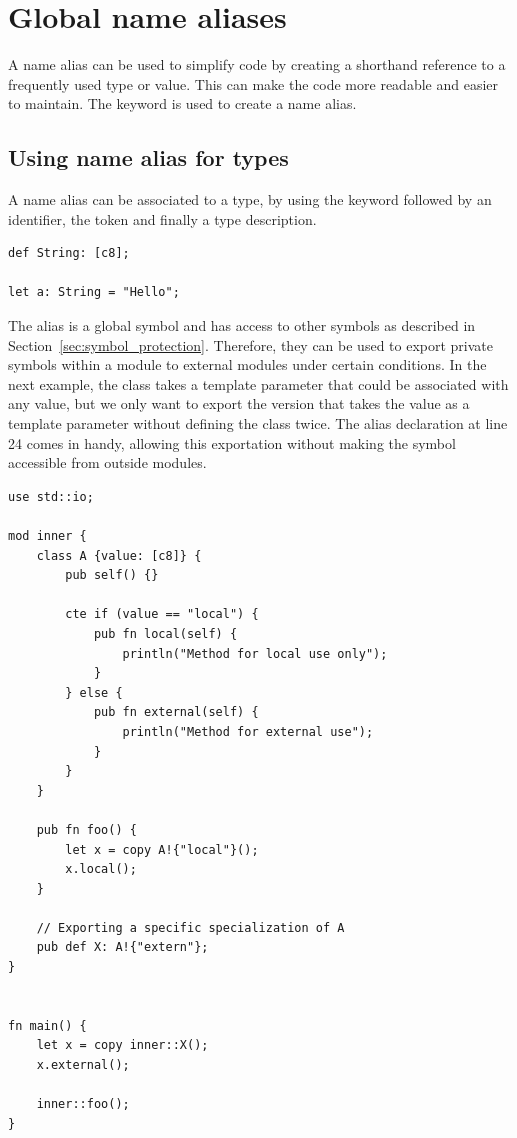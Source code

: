 \section{Global name aliases}
\label{sec:global_alias_names}

A name alias can be used to simplify code by creating a shorthand reference to a
frequently used type or value. This can make the code more readable and easier
to maintain. The keyword  is used to create a name alias.

\subsection {Using name alias for types}

A name alias can be associated to a type, by using the keyword 
followed by an identifier, the token \token{:} and finally a type description.

\begin{lstlisting}[style=coloredverbatim]
def String: [c8];

let a: String = "Hello";
\end{lstlisting}

The alias is a global symbol and has access to other symbols as described in
Section~\ref{sec:symbol_protection}. Therefore, they can be used to export
private symbols within a module to external modules under certain conditions. In
the next example, the class  takes a template parameter that could be
associated with any value, but we only want to export the version that takes the
value  as a template parameter without defining the class twice.
The alias declaration  at line 24 comes in handy, allowing this
exportation without making the symbol  accessible from outside modules.

\begin{lstlisting}[style=coloredverbatim]
use std::io;

mod inner {
    class A {value: [c8]} {
        pub self() {}

        cte if (value == "local") {
            pub fn local(self) {
                println("Method for local use only");
            }
        } else {
            pub fn external(self) {
                println("Method for external use");
            }
        }
    }

    pub fn foo() {
        let x = copy A!{"local"}();
        x.local();
    }

    // Exporting a specific specialization of A
    pub def X: A!{"extern"};
}


fn main() {
    let x = copy inner::X();
    x.external();

    inner::foo();
}
\end{lstlisting}

